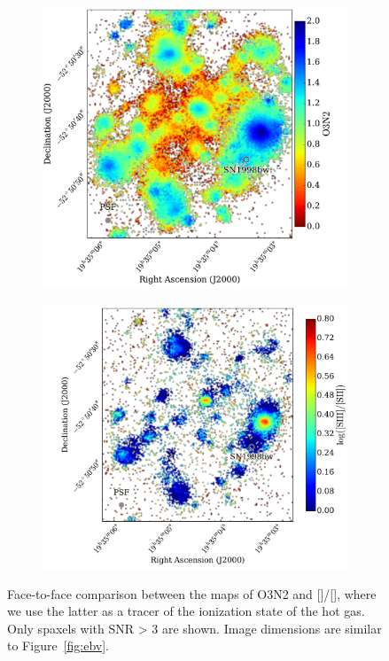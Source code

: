 \documentclass[traditabstract]{aa}
\newcommand{\sii}{[\ion{S}{ii}]}
\newcommand{\siii}{[\ion{S}{iii}]}
\begin{document}
\begin{figure}
\begin{subfigure}{.24\textwidth}
  \includegraphics[width=0.999\linewidth]{Figs/MUSE_SN1998bw_O3N2.pdf}
\end{subfigure}
\begin{subfigure}{.24\textwidth}
  \includegraphics[width=0.999\linewidth]{Figs/MUSE_SN1998bw_S3S2.pdf}
\end{subfigure}
\caption{Face-to-face comparison between the maps of O3N2 and \siii/\sii, where we use the latter as a tracer of the ionization state of the hot gas. Only spaxels with SNR > 3 are shown. Image dimensions are similar to Figure~\ref{fig:ebv}.}
\label{fig:s3s2}
\end{figure}
\end{document}

